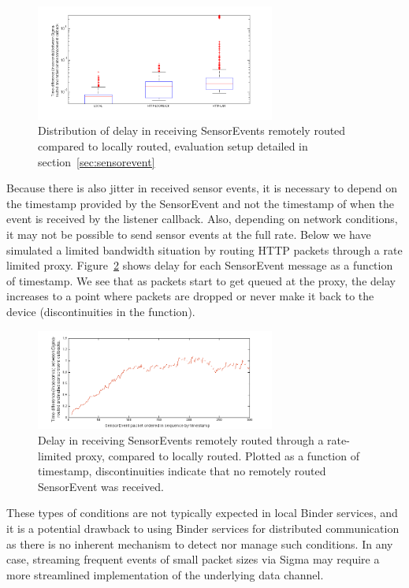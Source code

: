 \documentclass[prodmode]{acmlarge}
\begin{document}
\begin{figure}[h]
\centering
\includegraphics[width=0.7\textwidth]{plots/sensorevent_delay.png}
\caption{Distribution of delay in receiving SensorEvents remotely routed compared to locally routed, evaluation setup detailed in section~\ref{sec:sensorevent}}
\label{fig:sensorevent}
\end{figure}

Because there is also jitter in received sensor events, it is necessary to depend on the timestamp provided by the SensorEvent and not the timestamp of when the event is received by the listener callback. Also, depending on network conditions, it may not be possible to send sensor events at the full rate. Below we have simulated a limited bandwidth situation by routing HTTP packets through a rate limited proxy. Figure~\ref{fig:jitter} shows delay for each SensorEvent message as a function of timestamp. We see that as packets start to get queued at the proxy, the delay increases to a point where packets are dropped or never make it back to the device (discontinuities in the function).

\begin{figure}[h]
\centering
\includegraphics[width=0.7\textwidth]{plots/limited_bandwidth_increasing_latency.png}
\caption{Delay in receiving SensorEvents remotely routed through a rate-limited proxy, compared to locally routed. Plotted as a function of timestamp, discontinuities indicate that no remotely routed SensorEvent was received.}
\label{fig:jitter}
\end{figure}

These types of conditions are not typically expected in local Binder services, and it is a potential drawback to using Binder services for distributed communication as there is no inherent mechanism to detect nor manage such conditions. In any case, streaming frequent events of small packet sizes via Sigma may require a more streamlined implementation of the underlying data channel.
\end{document}
